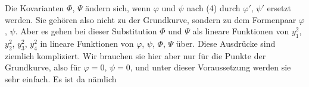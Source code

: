 Die Kovarianten $\Phi$, $\Psi$ ändern sich, wenn $\varphi$ und $\psi$
nach (4) durch $\varphi'$, $\psi'$ ersetzt werden. Sie gehören also
nicht zu der Grundkurve, sondern zu dem Formenpaar $\varphi$, $\psi$.
Aber es gehen bei dieser Substitution $\Phi$ und $\Psi$ als lineare
Funktionen von $y_1^2$, $y_2^2$, $y_3^2$, $y_4^2$ in lineare
Funktionen von $\varphi$, $\psi$, $\Phi$, $\Psi$ über. Diese Ausdrücke
sind ziemlich kompliziert. Wir brauchen sie hier aber nur für die
Punkte der Grundkurve, also für $\varphi = 0$, $\psi = 0$, und unter
dieser Voraussetzung werden sie sehr einfach. Es ist da nämlich
